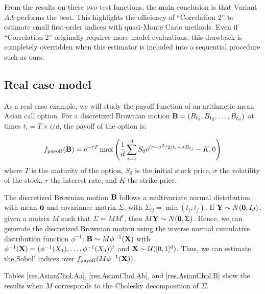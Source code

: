 From the results on these two test functions, the main conclusion is that Variant $A.b$ performs the best. This highlights the efficiency of ``Correlation 2'' to estimate small first-order indices with quasi-Monte Carlo methods. Even if ``Correlation 2'' originally requires more model evaluations, this drawback is completely overridden when this estimator is included into a sequential procedure such as ours.

\subsection{Real case model}
\label{sec:5.2}

As a real case example, we will study the payoff function of an arithmetic mean Asian call option. For a discretized Brownian motion $\boldsymbol{\mathbf{B}}=(B_{t_1}, B_{t_2},\dots, B_{t_d})$ at times $t_i=T\times i/d$, the payoff of the option is:

\[
f_{\rm payoff}(\boldsymbol{\mathbf{B}}) = \text{e}^{-rT}\max\left(\frac{1}{d}\sum_{i=1}^d S_0\text{e}^{(r-\sigma^2/2)t_i+\sigma B_{t_i}}-K, 0\right)
\]
where $T$ is the maturity of the option, $S_0$ is the initial stock price, $\sigma$ the volatility of the stock, $r$ the interest rate, and $K$ the strike price.

The discretized Brownian motion $\boldsymbol{\mathbf{B}}$ follows a multivariate normal distribution with mean $\boldsymbol{\mathbf{0}}$ and covariance matrix $\mathsf{\Sigma}$, with $\mathsf{\Sigma}_{ij}=\min(t_i,t_j)$. If $\boldsymbol{\mathbf{Y}}\sim N(\boldsymbol{\mathbf{0}},I_d)$, given a matrix $M$ such that $\mathsf{\Sigma}=MM^t$, then $M\boldsymbol{\mathbf{Y}}\sim N(\boldsymbol{\mathbf{0}},\mathsf{\Sigma})$. Hence, we can generate the discretized Brownian motion using the inverse normal cumulative distribution function $\phi^{-1}$: $\boldsymbol{\mathbf{B}}\sim M\phi^{-1}(\boldsymbol{\mathbf{X}})$ with $\phi^{-1}(\boldsymbol{\mathbf{X}})=(\phi^{-1}(X_1),\dots,\phi^{-1}(X_d))^t$ and $\boldsymbol{\mathbf{X}}\sim \mathcal{U}([0,1]^d)$. Thus, we can estimate the Sobol' indices over $f_{\rm payoff}(M\phi^{-1}(\boldsymbol{\mathbf{X}}))$.

Tables \ref{res.AsianChol.Aa}, \ref{res.AsianChol.Ab}, and \ref{res.AsianChol.B} show the results when $M$ corresponds to the Cholesky decomposition of $\mathsf{\Sigma}$.

